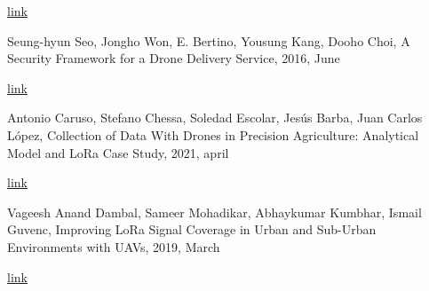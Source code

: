 \documentclass{article}
\begin{document}
\begin{flushleft}
\href{https://link.springer.com/chapter/10.1007/978-3-319-94496-8_7}{link}

\bigskip

Seung-hyun Seo, 
Jongho Won, E. Bertino, Yousung Kang, Dooho Choi, A Security Framework for a Drone Delivery Service, 2016, June

\href{https://dl.acm.org/doi/abs/10.1145/2935620.2935629}{link}

\bigskip

Antonio Caruso, Stefano Chessa, Soledad Escolar, Jesús Barba, Juan Carlos López, Collection of Data With Drones in Precision Agriculture: Analytical Model and LoRa Case Study, 2021, april

\href{https://ieeexplore.ieee.org/abstract/document/9416287}{link}

\bigskip

Vageesh Anand Dambal, Sameer Mohadikar, Abhaykumar Kumbhar, Ismail Guvenc, Improving LoRa Signal Coverage in Urban and Sub-Urban Environments with UAVs, 2019, March

\href{https://ieeexplore.ieee.org/abstract/document/8730598}{link}

\bigskip

\end{flushleft}
\end{document}
